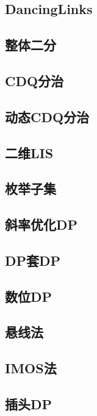 \documentclass{article}
\begin{document}
\subsection{DancingLinks} 

\subsection{整体二分} 

\subsection{CDQ分治} 

\subsection{动态CDQ分治} 

\subsection{二维LIS} 

\subsection{枚举子集} 

\subsection{斜率优化DP} 

\subsection{DP套DP} 

\subsection{数位DP} 

\subsection{悬线法} 

\subsection{IMOS法} 

\subsection{插头DP} 

\end{document}
